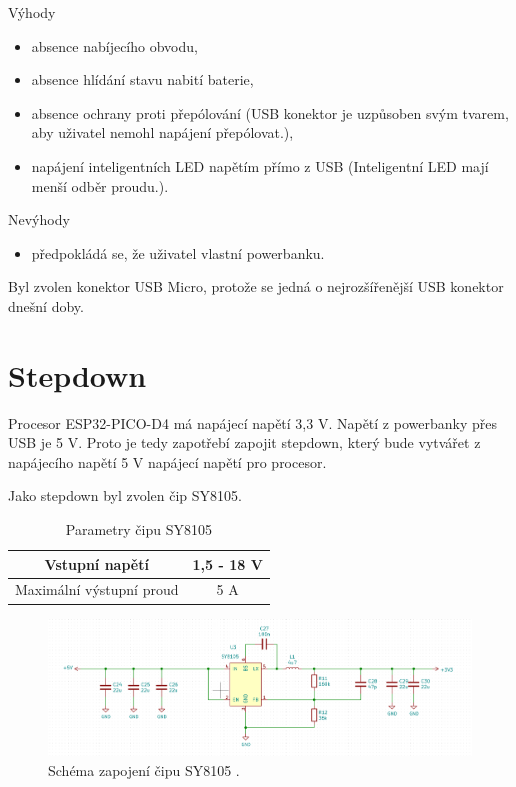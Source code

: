   Výhody
  \begin{itemize}
    \item absence nabíjecího obvodu,
    \item absence hlídání stavu nabití baterie,
    \item absence ochrany proti přepólování (USB konektor je uzpůsoben svým tvarem, aby uživatel nemohl napájení přepólovat.),
    \item napájení inteligentních LED napětím přímo z USB (Inteligentní LED mají menší odběr proudu.).
  \end{itemize}

  Nevýhody
  \begin{itemize}
    \item předpokládá se, že uživatel vlastní powerbanku.%
  \end{itemize}

  Byl zvolen konektor USB Micro, protože se jedná o nejrozšířenější USB konektor dnešní doby.

  \section{Stepdown}
  Procesor ESP32-PICO-D4 má napájecí napětí 3,3 V. Napětí z powerbanky přes USB je 5 V. Proto je tedy zapotřebí zapojit 
  stepdown, který bude vytvářet z napájecího napětí 5 V napájecí napětí pro procesor.

  Jako stepdown byl zvolen čip SY8105.

  \begin{table}[!h]
    \caption{Parametry čipu SY8105 \cite{SY8105_datasheet}}
    \begin{center}
        \begin{tabular}{|c|c|}
            \hline
            Vstupní napětí             & 1,5 - 18 V \\
            \hline
            Maximální výstupní proud   & 5 A \\
            \hline
        \end{tabular}    
    \end{center}
\end{table}

  \begin{figure}[!h]
    \begin{center}
      \includegraphics[scale=0.4]{obrazky/SY8105_schema.png}
    \end{center}
    \caption[Schéma zapojení čipu SY8105]{Schéma zapojení čipu SY8105 \cite{SY8105_datasheet}.}
  \end{figure}

